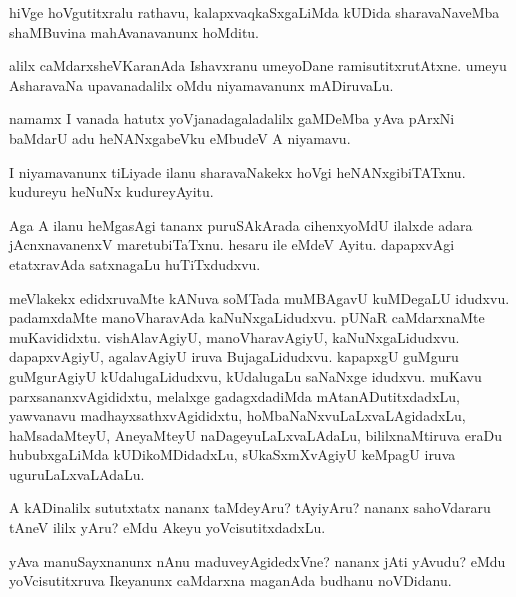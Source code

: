 \documentclass{article}
\begin{document}
\begin{mn}
hiVge hoVgutitxralu rathavu, kalapxvaqkaSxgaLiMda kUDida
sharavaNaveMba shaMBuvina mahAvanavanunx hoMditu.
\end{mn}

\begin{mn}
alilx caMdarxsheVKaranAda Ishavxranu umeyoDane
ramisutitxrutAtxne. umeyu AsharavaNa upavanadalilx oMdu niyamavanunx mADiruvaLu.
\end{mn}

\begin{mn}%
namamx I vanada hatutx yoVjanadagaladalilx gaMDeMba yAva pArxNi
baMdarU adu heNANxgabeVku eMbudeV A niyamavu.
\end{mn}

\begin{mn}
I niyamavanunx tiLiyade ilanu sharavaNakekx hoVgi
heNANxgibiTATxnu. kudureyu heNuNx kudureyAyitu.
\end{mn}

\begin{mn}
Aga A ilanu heMgasAgi tananx puruSAkArada cihenxyoMdU ilalxde adara
jAcnxnavanenxV maretubiTaTxnu. hesaru ile eMdeV Ayitu. dapapxvAgi
etatxravAda satxnagaLu huTiTxdudxvu.
\end{mn}

\begin{mn}%
meVlakekx edidxruvaMte kANuva soMTada muMBAgavU kuMDegaLU
idudxvu. padamxdaMte manoVharavAda kaNuNxgaLidudxvu. pUNaR
caMdarxnaMte muKavididxtu. vishAlavAgiyU, manoVharavAgiyU,
kaNuNxgaLidudxvu. dapapxvAgiyU, agalavAgiyU iruva
BujagaLidudxvu. kapapxgU guMguru guMgurAgiyU kUdalugaLidudxvu,
kUdalugaLu saNaNxge idudxvu. muKavu parxsananxvAgididxtu, melalxge
gadagxdadiMda mAtanADutitxdadxLu, yawvanavu madhayxsathxvAgididxtu,
hoMbaNaNxvuLaLxvaLAgidadxLu, haMsadaMteyU, AneyaMteyU
naDageyuLaLxvaLAdaLu, bililxnaMtiruva eraDu hububxgaLiMda
kUDikoMDidadxLu, sUkaSxmXvAgiyU keMpagU iruva uguruLaLxvaLAdaLu.
\end{mn}

\begin{mn}
A kADinalilx sututxtatx nananx taMdeyAru? tAyiyAru? nananx sahoVdararu
tAneV ililx yAru? eMdu Akeyu yoVcisutitxdadxLu.
\end{mn}

\begin{mn}%
yAva manuSayxnanunx nAnu maduveyAgidedxVne? nananx jAti yAvudu? eMdu
yoVcisutitxruva Ikeyanunx caMdarxna maganAda budhanu noVDidanu.
\end{mn}
\end{document}
